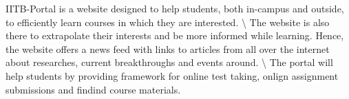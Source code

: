 I\+I\+T\+B-\/\+Portal is a website designed to help students, both in-\/campus and outside, to efficiently learn courses in which they are interested. \textbackslash{} The website is also there to extrapolate their interests and be more informed while learning. Hence, the website offers a news feed with links to articles from all over the internet about researches, current breakthroughs and events around. \textbackslash{} The portal will help students by providing framework for online test taking, onlign assignment submissions and findind course materials. 